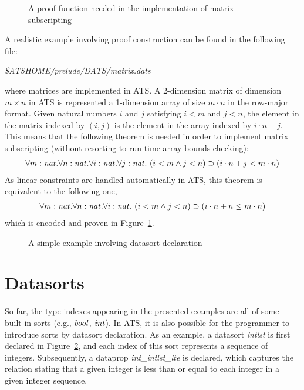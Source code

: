 \begin{figure}

\caption{A proof function needed in the implementation of matrix subscripting}
\label{figure:lemma_for_matrix_subscripting}
\end{figure}
\kern6pt
A realistic example involving proof construction can be found in
the following file:
\begin{center}
{\it \$ATSHOME/prelude/DATS/matrix.dats}
\end{center}
where matrices are implemented in ATS. A 2-dimension matrix of dimension
$m\times n$ in ATS is represented a 1-dimension array of size $m\cdot n$ in
the row-major format. Given natural numbers $i$ and $j$ satisfying $i<m$
and $j<n$, the element in the matrix indexed by $(i,j)$ is the element in
the array indexed by $i\cdot n+j$. This means that the following theorem is
needed in order to implement matrix subscripting (without resorting to
run-time array bounds checking):
\[\begin{array}{l}
\forall m:{\it nat}.\forall n:{\it nat}.\forall i:{\it nat}.\forall j:{\it nat}.~
(i<m\land j<n)\supset (i\cdot n + j < m\cdot n)
\end{array}\]
As linear constraints are handled automatically in ATS,
this theorem is equivalent to the following one,
\[\begin{array}{l}
\forall m:{\it nat}.\forall n:{\it nat}.\forall i:{\it nat}.~
(i<m\land j<n)\supset (i\cdot n + n \leq m\cdot n)
\end{array}\]
which is encoded and proven in Figure~\ref{figure:lemma_for_matrix_subscripting}.

\begin{figure}[thp]

\caption{A simple example involving datasort declaration}
\label{figure:intlst_datasort_example}
\end{figure}
\section{Datasorts}
So far, the type indexes appearing in the presented examples are all of
some built-in sorts (e.g., ${\it bool}$, ${\it int}$). In ATS, it is also possible
for the programmer to introduce sorts by datasort declaration. As an
example, a datasort {\it intlst} is first declared in
Figure~\ref{figure:intlst_datasort_example}, and each index of this sort
represents a sequence of integers. Subsequently, a dataprop {\it
int\_intlst\_lte} is declared, which captures the relation stating that a
given integer is less than or equal to each integer in a given integer
sequence.


